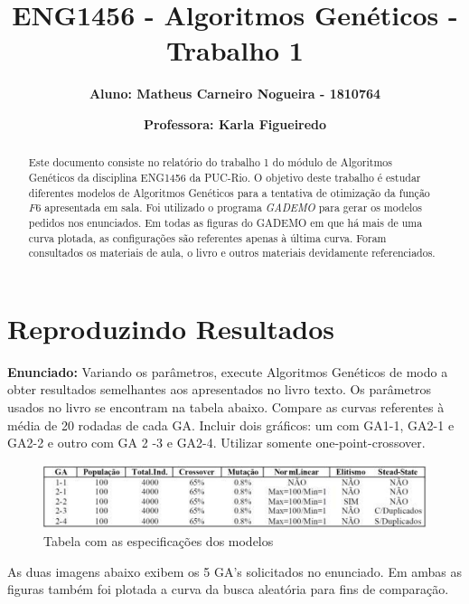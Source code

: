 \documentclass[12pt]{article}
\title{\textbf{ENG1456 - Algoritmos Genéticos - Trabalho 1}}
\author{\textbf{Aluno: Matheus Carneiro Nogueira - 1810764}}
\affil{}
\author{\textbf{Professora: Karla Figueiredo}}
\affil{}
\date{}
\begin{document}
	\maketitle
	\tableofcontents
	
	
	\begin{abstract}
		Este documento consiste no relatório do trabalho 1 do módulo de Algoritmos Genéticos da disciplina ENG1456 da PUC-Rio. O objetivo deste trabalho é estudar diferentes modelos de Algoritmos Genéticos para a tentativa de otimização da função $F6$ apresentada em sala. Foi utilizado o programa \textit{GADEMO} para gerar os modelos pedidos nos enunciados. Em todas as figuras do GADEMO em que há mais de uma curva plotada, as configurações são referentes apenas à última curva. Foram consultados os materiais de aula, o livro \cite{davis1991handbook} e outros materiais devidamente referenciados.
	\end{abstract}
	
\section{Reproduzindo Resultados}

\textbf{Enunciado:}
Variando os parâmetros, execute Algoritmos Genéticos de modo a obter resultados semelhantes aos apresentados no livro texto. Os parâmetros usados no livro se encontram na tabela abaixo. Compare as curvas referentes à média de 20 rodadas de cada GA. Incluir dois gráficos: um com GA1-1, GA2-1 e GA2-2 e outro com GA 2 -3 e GA2-4. Utilizar somente one-point-crossover.

\begin{figure}[H]
	\centering
	\includegraphics[width=0.9\linewidth]{Imagens/tabela_especificacao_modelos}
	\caption{Tabela com as especificações dos modelos}
	\label{fig:tabelaespecificacaomodelos}
\end{figure}


As duas imagens abaixo exibem os 5 GA's solicitados no enunciado. Em ambas as figuras também foi plotada a curva da busca aleatória para fins de comparação.
\end{document}
